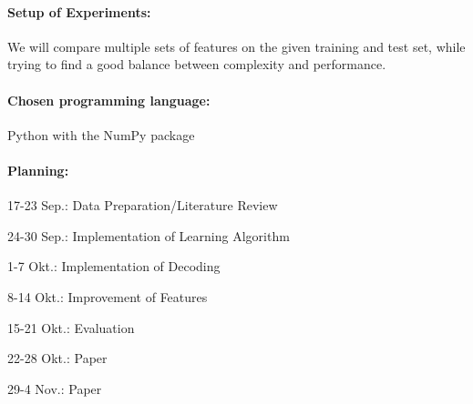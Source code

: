 \documentclass[a4paper,10pt]{article}
\begin{document}
% 
\paragraph{Setup of Experiments:}
We will compare multiple sets of features on the given training and test set, 
while trying to find a good balance between complexity and performance.


\paragraph{Chosen programming language:}
Python with the NumPy package

\paragraph{Planning:}
17-23 Sep.: Data Preparation/Literature Review

24-30 Sep.: Implementation of Learning Algorithm

1-7 Okt.: Implementation of Decoding

8-14 Okt.: Improvement of Features

15-21 Okt.: Evaluation 

22-28 Okt.: Paper 

29-4 Nov.: Paper




{\small


}
\end{document}
